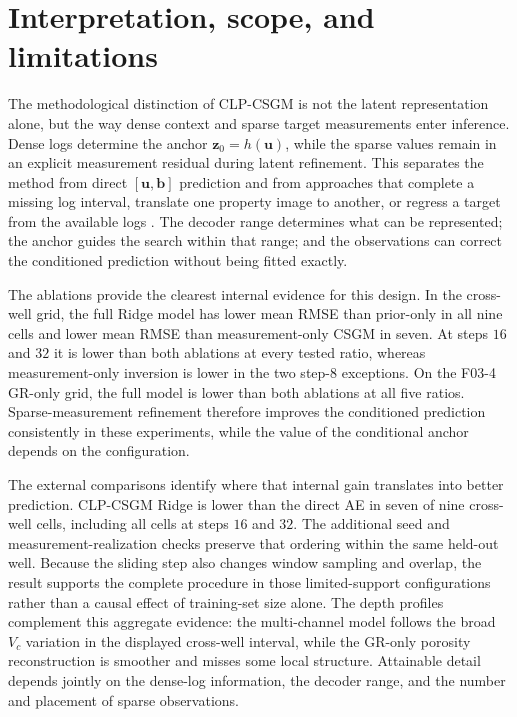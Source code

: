 \section{Interpretation, scope, and limitations}
\label{sec:discussion}

The methodological distinction of CLP-CSGM is not the latent representation
alone, but the way dense context and sparse target measurements enter
inference. Dense logs determine the anchor
$\boldsymbol{z}_0=h(\boldsymbol{u})$, while the sparse values remain in an
explicit measurement residual during latent refinement. This separates the
method from direct $[\boldsymbol{u},\boldsymbol{b}]$ prediction and from
approaches that complete a missing log interval, translate one property image
to another, or regress a target from the available logs
\citep{koeshidayatullah2026timegpt,alfakih2026pix2geomodel,
alfakih2025wellloggan,alfakih2023northsea}. The decoder range determines what
can be represented; the anchor guides the search within that range; and the
observations can correct the conditioned prediction without being fitted
exactly.

The ablations provide the clearest internal evidence for this design. In the
cross-well grid, the full Ridge model has lower mean RMSE than prior-only in
all nine cells and lower mean RMSE than measurement-only CSGM in seven. At
steps $16$ and $32$ it is lower than both ablations at every tested ratio,
whereas measurement-only inversion is lower in the two step-$8$ exceptions.
On the F03-4 GR-only grid, the full model is lower than both ablations at all
five ratios. Sparse-measurement refinement therefore improves the conditioned
prediction consistently in these experiments, while the value of the
conditional anchor depends on the configuration.

The external comparisons identify where that internal gain translates into
better prediction. CLP-CSGM Ridge is lower than the direct AE in seven of
nine cross-well cells, including all cells at steps $16$ and $32$. The
additional seed and measurement-realization checks preserve that ordering
within the same held-out well. Because the sliding step also changes window
sampling and overlap, the result supports the complete procedure in those
limited-support configurations rather than a causal effect of training-set
size alone. The depth profiles complement this aggregate evidence: the
multi-channel model follows the broad $V_c$ variation in the displayed
cross-well interval, while the GR-only porosity reconstruction is smoother
and misses some local structure. Attainable detail depends jointly on the
dense-log information, the decoder range, and the number and placement of
sparse observations.

